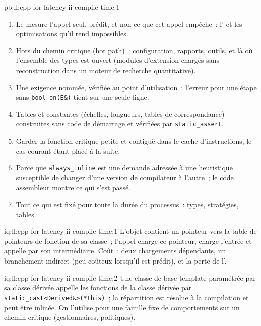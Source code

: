 \begin{solution}{pb:ll:cpp-for-latency-ii-compile-time:1}
\begin{enumerate}
\item Le  mesure l'appel seul, prédit, et non ce que cet appel empêche~: l' et les optimisations qu'il rend impossibles.
\item Hors du chemin critique (hot path)~: configuration, rapports, outils, et là où l'ensemble des types est ouvert (modules d'extension chargés sans
reconstruction dans un moteur de recherche quantitative).
\item Une exigence nommée, vérifiée au point d'utilisation~: l'erreur pour une étape sans \texttt{bool on(E\&)} tient sur une seule ligne.
\item Tables et constantes (échelles, longueurs, tables de correspondance) construites sans code de démarrage et vérifiées par
\texttt{static\_assert}.
\item Garder la fonction critique petite et contiguë dans le cache d'instructions, le cas courant étant placé à la suite.
\item Parce que \texttt{always\_inline} est une demande adressée à une heuristique susceptible de changer d'une version de compilateur à l'autre~; le code
assembleur montre ce qui s'est passé.
\item Tout ce qui est fixé pour toute la durée du processus~: types, stratégies, tables.
\end{enumerate}
\end{solution}

\begin{solution}{iq:ll:cpp-for-latency-ii-compile-time:1}
L'objet contient un pointeur vers la table de pointeurs de fonction de sa classe~; l'appel charge ce pointeur, charge l'entrée et appelle
par son intermédiaire. Coût~: deux chargements dépendants, un branchement indirect (peu coûteux lorsqu'il est prédit), et la perte de l'.
\end{solution}

\begin{solution}{iq:ll:cpp-for-latency-ii-compile-time:2}
Une classe de base template paramétrée par sa classe dérivée appelle les fonctions de la classe dérivée par
\texttt{static\_cast<Derived\&>(*this)}~; la répartition est résolue à la compilation et peut être inlinée. On l'utilise pour une famille fixe de
comportements sur un chemin critique (gestionnaires, politiques).
\end{solution}

